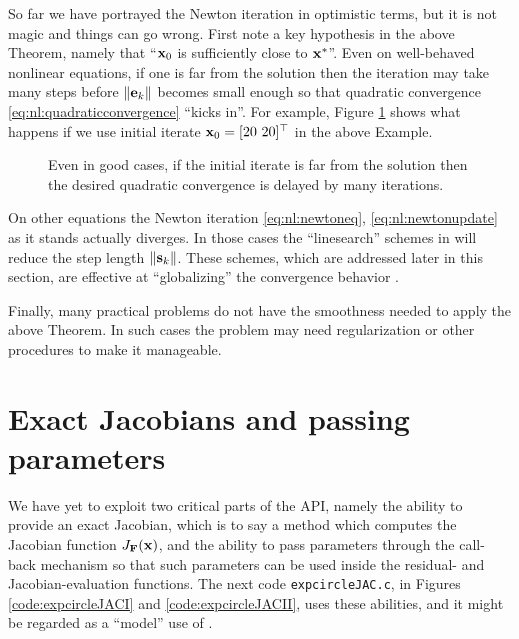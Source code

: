 So far we have portrayed the Newton iteration in optimistic terms, but it is not magic and things can go wrong.  First note a key hypothesis in the above Theorem, namely that ``$\mathbf{x}_0$ is sufficiently close to $\mathbf{x}^*$''.  Even on well-behaved nonlinear equations, if one is far from the solution then the iteration may take many steps before $\|\mathbf{e}_k\|$ becomes small enough so that quadratic convergence \eqref{eq:nl:quadraticconvergence} ``kicks in''.  For example, Figure \ref{fig:newtonconvdelayed} shows what happens if we use initial iterate $\mathbf{x}_0=[20\,\, 20]^\top$ in the above Example.

\begin{figure}
\caption{Even in good cases, if the initial iterate is far from the solution then the desired quadratic convergence is delayed by many iterations.}
\label{fig:newtonconvdelayed}
\end{figure}

On other equations the Newton iteration \eqref{eq:nl:newtoneq}, \eqref{eq:nl:newtonupdate} as it stands actually diverges.  In those cases the ``linesearch'' schemes in \PETSc will reduce the step length $\|\mathbf{s}_k\|$.  These schemes, which are addressed later in this section, are effective at ``globalizing'' the convergence behavior \citep{Kelley2003}.

Finally, many practical problems do not have the smoothness needed to apply the above Theorem.  In such cases the problem may need regularization or other procedures to make it manageable.



\section{Exact Jacobians and passing parameters}

We have yet to exploit two critical parts of the \pSNES API, namely the ability to provide an exact Jacobian, which is to say a method which computes the Jacobian function $J_{\mathbf{F}}(\mathbf{x})$, and the ability to pass parameters through the call-back mechanism so that such parameters can be used inside the residual- and Jacobian-evaluation functions.  The next code \texttt{expcircleJAC.c}, in Figures \ref{code:expcircleJACI} and \ref{code:expcircleJACII}, uses these abilities, and it might be regarded as a ``model'' use of \pSNES.

